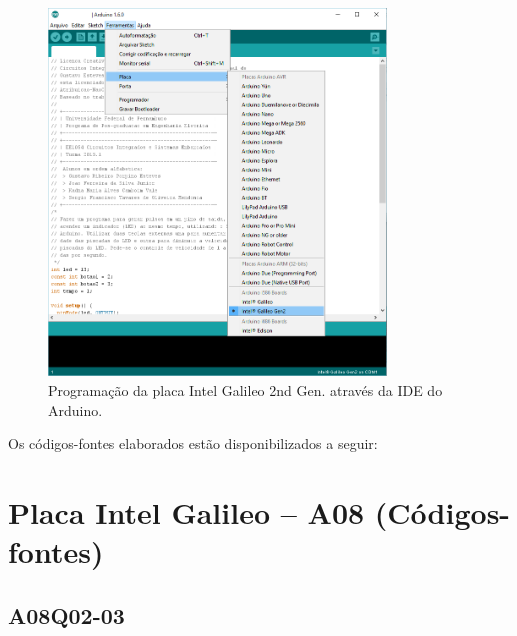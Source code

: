 \documentclass[
	12pt,				%
	openright,			%
  oneside,     %
	a4paper,			%
	english,			%
	french,				%
	spanish,			%
	brazil				%
	]{abntex2}
\begin{document}
\newpage

\begin{figure}[ht]
  \centering
  \caption{\label{fig:cha-8-IDE-GALILEO-GEN2}Programação da placa Intel Galileo 2nd Gen. através da IDE do Arduino.}
  \includegraphics[width=0.8\textwidth]{images/Atividade08/IDE-GALILEO-GEN2.png}
\end{figure}

\newpage

Os códigos-fontes elaborados estão disponibilizados a seguir:

\section*{Placa Intel Galileo -- A08 (Códigos-fontes)}
\label{sec:IntelGalileo}
\subsection*{A08Q02-03}




\end{document}
